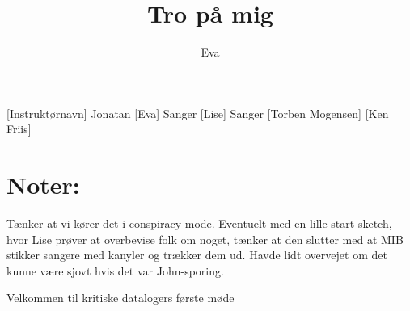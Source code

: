 \documentclass[a4paper,11pt]{article}
\title{Tro på mig}
\author{Eva}
\begin{document}
\maketitle

\begin{roles}
[Instruktørnavn] Jonatan
[Eva] Sanger 
[Lise] Sanger
 [Torben Mogensen]
 [Ken Friis]
\end{roles}
\section*{Noter:}
Tænker at vi kører det i conspiracy mode. Eventuelt med en lille start sketch, hvor Lise prøver at overbevise folk om noget, tænker at den slutter med at MIB stikker sangere med kanyler og trækker dem ud.
Havde lidt overvejet om det kunne være sjovt hvis det var John-sporing. 

\begin{props}
\end{props}


\begin{sketch}
 Velkommen til kritiske datalogers første møde
\end{sketch}
\end{document}
